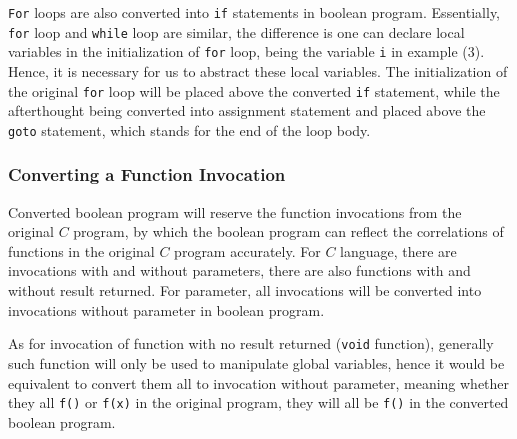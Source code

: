 \lstinline|For| loops are also converted into \lstinline|if| statements in boolean program.
Essentially, \lstinline|for| loop and \lstinline|while| loop are similar, the difference is one can declare local variables in the initialization of \lstinline|for| loop, being the variable \lstinline|i| in example (3).
Hence, it is necessary for us to abstract these local variables.
The initialization of the original \lstinline|for| loop will be placed above the converted \lstinline|if| statement,
while the afterthought being converted into assignment statement and placed above the \lstinline|goto| statement, which stands for the end of the loop body.

\subsubsection{Converting a Function Invocation}
\label{section:ConvertingAFunctionInvocation}
Converted boolean program will reserve the function invocations from the original $C$ program, by which the boolean program can reflect the correlations of functions in the original $C$ program accurately.
For $C$ language, there are invocations with and without parameters, there are also functions with and without result returned. For parameter, all invocations will be converted into invocations without parameter in boolean program.

As for invocation of function with no result returned (\lstinline|void| function), generally such function will only be used to manipulate global variables, hence it would be equivalent to convert them all to invocation without parameter, meaning whether they all \lstinline|f()| or \lstinline|f(x)| in the original program, they will all be \lstinline|f()| in the converted boolean program.

